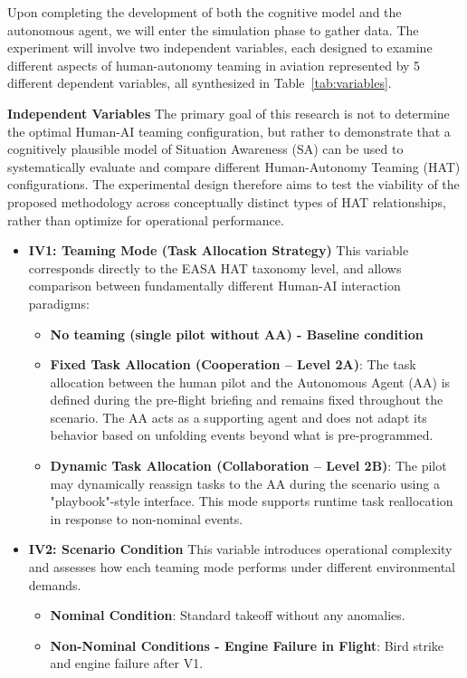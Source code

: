 \documentclass[12pt,a4paper]{article} %
\begin{document}
	Upon completing the development of both the cognitive model and the autonomous agent, we will enter the simulation phase to gather data. The experiment will involve two independent variables, each designed to examine different aspects of human-autonomy teaming in aviation represented by 5 different dependent variables, all synthesized in Table~\ref{tab:variables}.
	
	\textbf{Independent Variables}
	The primary goal of this research is not to determine the optimal Human-AI teaming configuration, but rather to demonstrate that a cognitively plausible model of Situation Awareness (SA) can be used to systematically evaluate and compare different Human-Autonomy Teaming (HAT) configurations. The experimental design therefore aims to test the viability of the proposed methodology across conceptually distinct types of HAT relationships, rather than optimize for operational performance.

	\begin{itemize}
	\item \textbf{IV1: Teaming Mode (Task Allocation Strategy)}
	This variable corresponds directly to the EASA HAT taxonomy level, and allows comparison between fundamentally different Human-AI interaction paradigms:

	\begin{itemize}
	\item \textbf{No teaming (single pilot without AA) - Baseline condition}
	\item \textbf{Fixed Task Allocation (Cooperation – Level 2A)}:  
	The task allocation between the human pilot and the Autonomous Agent (AA) is defined during the pre-flight briefing and remains fixed throughout the scenario. The AA acts as a supporting agent and does not adapt its behavior based on unfolding events beyond what is pre-programmed.

	\item \textbf{Dynamic Task Allocation (Collaboration – Level 2B)}:  
	The pilot may dynamically reassign tasks to the AA during the scenario using a "playbook"-style interface. This mode supports runtime task reallocation in response to non-nominal events.
	\end{itemize}

	\item \textbf{IV2: Scenario Condition}
	This variable introduces operational complexity and assesses how each teaming mode performs under different environmental demands.

	\begin{itemize}
	\item \textbf{Nominal Condition}:  
	Standard takeoff without any anomalies.
	\item \textbf{Non-Nominal Conditions - Engine Failure in Flight}: Bird strike and engine failure after V1.
	\end{itemize}
	\end{itemize}
\end{document}
